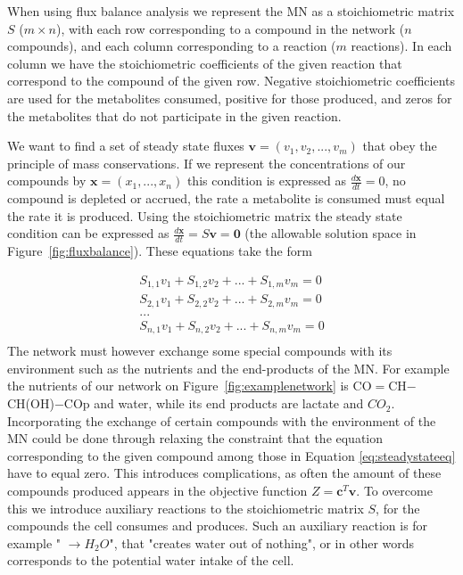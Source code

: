 \documentclass[a4paper,12pt]{article}
\begin{document}
	When using flux balance analysis we represent the MN as a stoichiometric matrix $S$ ($m\times n$), with each row corresponding to a compound in the network ($n$ compounds), and each column corresponding to a reaction ($m$ reactions). In each column we have the stoichiometric coefficients of the given reaction that correspond to the compound of the given row. Negative stoichiometric coefficients are used for the metabolites consumed, positive for those produced, and zeros for the metabolites that do not participate in the given reaction.
	
	We want to find a set of steady state fluxes  $\mathbf{v}=\left( v_1,v_2,...,v_m \right)$ that obey the principle of mass conservations. If we represent the concentrations of our compounds by  ${\mathbf{x}=\left( x_1, ... , x_n \right)}$ this condition is expressed as $\frac{d\mathbf{x}}{dt}=0$, no compound is depleted or accrued, the rate a metabolite is consumed must equal the rate it is produced. Using the stoichiometric matrix the steady state condition can be expressed as $\frac{d\mathbf{x}}{dt}= S\mathbf{v}=\mathbf{0}$ (the allowable solution space in Figure~\ref{fig:fluxbalance}). These equations take the form
	
	\begin{equation}\label{eq:steadystateeq}
		\begin{matrix}
			S_{1,1} v_1 + S_{1,2} v_2 + ... + S_{1,m} v_m=0 \\
			S_{2,1} v_1 + S_{2,2} v_2 + ... + S_{2,m} v_m=0 \\
			... \\
			S_{n,1} v_1 + S_{n,2} v_2 + ... + S_{n,m} v_m=0 \\
		\end{matrix}
	\end{equation}
	The network must however exchange some special compounds with its environment such as the nutrients and the end-products of the MN. For example the nutrients of our network on Figure~\ref {fig:examplenetwork} is CO$=$CH$-$CH(OH)$-$COp and water, while its end products are lactate and $CO_2$. Incorporating the exchange of certain compounds with the environment of the MN could be done through relaxing the constraint that the equation corresponding to the given compound among those in Equation \ref{eq:steadystateeq} have to equal zero. This introduces complications, as often the amount of these compounds produced appears in the objective function  $Z=\mathbf{c}^T \mathbf{v}$. To overcome this we introduce auxiliary reactions to the stoichiometric matrix $S$, for the compounds the cell consumes and produces. Such an auxiliary reaction is for example " $ \rightarrow H_2O$", that "creates water out of nothing", or in other words corresponds to the potential water intake of the cell.%
\end{document}
